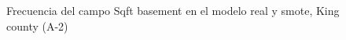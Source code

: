 \begin{figure}[H]
    \centering
    
    \caption{Frecuencia del campo Sqft basement en el modelo real y smote, King county (A-2)}
    \label{frecuency-smote-sqft basement}
\end{figure}
